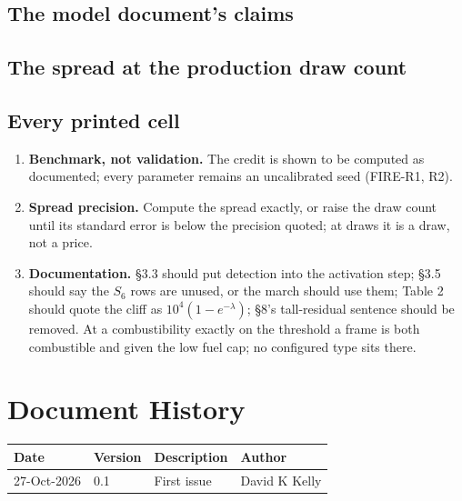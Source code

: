 \documentclass[11pt,a4paper]{article}
\renewcommand{\mkmhistorypage}[1]{%
    \section{Document History}
    \begin{table}[ht]
        \centering
        \begin{tabular}{l|l|p{9cm}|l}
            \textbf{Date} & \textbf{Version} & \textbf{Description} & \textbf{Author} \\
            \hline
            #1
        \end{tabular}
    \end{table}
}
\begin{document}
\mkmvalidation



\subsection{The model document's claims}


\subsection{The spread at the production draw count}


\subsection{Every printed cell}


\mkmlimitations

\begin{enumerate}[leftmargin=*]
\item \textbf{Benchmark, not validation.} The credit is shown to be computed as
  documented; every parameter remains an uncalibrated seed (FIRE-R1, R2).
\item \textbf{Spread precision.} Compute the spread exactly, or raise the draw count
  until its standard error is below the precision quoted; at \bmProductionN{} draws it
  is a draw, not a price.
\item \textbf{Documentation.} \S3.3 should put detection into the activation step;
  \S3.5 should say the $S_6$ rows are unused, or the march should use them; Table 2
  should quote the cliff as $10^4(1-e^{-\lambda})$; \S8's tall-residual sentence
  should be removed. At a combustibility exactly on the threshold a frame is both
  combustible and given the low fuel cap; no configured type sits there.
\end{enumerate}

\mkmhistorypage{27-Oct-2026 & 0.1 & First issue & David K Kelly \\}
\end{document}
